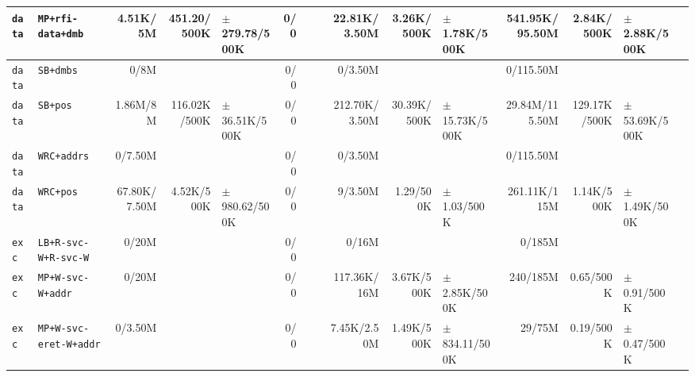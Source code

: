 \begin{tabular}{l l  | r r l | r r l | r r l | r r l l}
           \verb|data| &                                      \verb|MP+rfi-data+dmb| &       4.51K/5M &           451.20/500K & $\pm$ 279.78/500K &            0/0 &                       &  &   22.81K/3.50M &            3.26K/500K &  $\pm$ 1.78K/500K & 541.95K/95.50M &            2.84K/500K &   $\pm$ 2.88K/500K & \\ \hline 
           \verb|data| &                                              \verb|SB+dmbs| &           0/8M &                       &                   &            0/0 &                       &  &        0/3.50M &                       &                   &      0/115.50M &                       &                    & \\ \hline 
           \verb|data| &                                               \verb|SB+pos| &       1.86M/8M &          116.02K/500K & $\pm$ 36.51K/500K &            0/0 &                       &  &  212.70K/3.50M &           30.39K/500K & $\pm$ 15.73K/500K & 29.84M/115.50M &          129.17K/500K &  $\pm$ 53.69K/500K & \\ \hline 
           \verb|data| &                                            \verb|WRC+addrs| &        0/7.50M &                       &                   &            0/0 &                       &  &        0/3.50M &                       &                   &      0/115.50M &                       &                    & \\ \hline 
           \verb|data| &                                              \verb|WRC+pos| &   67.80K/7.50M &            4.52K/500K & $\pm$ 980.62/500K &            0/0 &                       &  &        9/3.50M &             1.29/500K &   $\pm$ 1.03/500K &   261.11K/115M &            1.14K/500K &   $\pm$ 1.49K/500K & \\ \hline 
            \verb|exc| &                                   \verb|LB+R-svc-W+R-svc-W| &          0/20M &                       &                   &            0/0 &                       &  &          0/16M &                       &                   &         0/185M &                       &                    & \\ \hline 
            \verb|exc| &                                      \verb|MP+W-svc-W+addr| &          0/20M &                       &                   &            0/0 &                       &  &    117.36K/16M &            3.67K/500K &  $\pm$ 2.85K/500K &       240/185M &             0.65/500K &    $\pm$ 0.91/500K & \\ \hline 
            \verb|exc| &                                 \verb|MP+W-svc-eret-W+addr| &        0/3.50M &                       &                   &            0/0 &                       &  &    7.45K/2.50M &            1.49K/500K & $\pm$ 834.11/500K &         29/75M &             0.19/500K &    $\pm$ 0.47/500K & \\ \hline 

\end{tabular}
